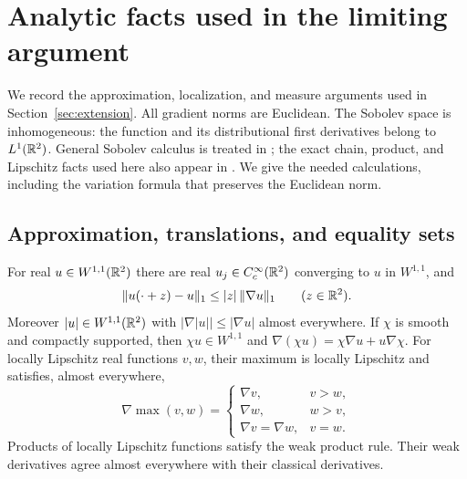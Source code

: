 \section{Analytic facts used in the limiting argument}
\label{app:analytic-tools}

We record the approximation, localization, and measure arguments
used in Section~\ref{sec:extension}. All gradient norms are
Euclidean. The Sobolev space is inhomogeneous: the function and
its distributional first derivatives belong to $L^1(\mathbb R^2)$.
General Sobolev calculus is treated in \cite{EvansGariepy2015};
the exact chain, product, and Lipschitz facts used here also appear
in \cite[Chapter~3, Propositions~3.21--3.22 and
Theorems~3.38--3.39]{Hunter2014}. We give the needed calculations,
including the variation formula that preserves the Euclidean norm.

\subsection{Approximation, translations, and equality sets}

\begin{lemma}\label{lem:appendix-sobolev-calculus}
For real $u\in W^{1,1}(\mathbb R^2)$ there are real
$u_j\in C_c^\infty(\mathbb R^2)$ converging to $u$ in $W^{1,1}$, and
\begin{equation}\label{eq:appendix-translation}
 \|u(\cdot+z)-u\|_1\le |z|\,\|\nabla u\|_1
 \qquad(z\in\mathbb R^2).
\end{equation}
Moreover $|u|\in W^{1,1}(\mathbb R^2)$ with
$|\nabla|u||\le|\nabla u|$ almost everywhere. If $\chi$ is
smooth and compactly supported, then $\chi u\in W^{1,1}$ and
$\nabla(\chi u)=\chi\nabla u+u\nabla\chi$.
For locally Lipschitz real functions $v,w$, their maximum is
locally Lipschitz and satisfies, almost everywhere,
\begin{equation}\label{eq:appendix-maximum}
 \nabla\max(v,w)=
 \begin{cases}
  \nabla v,&v>w,\\
  \nabla w,&w>v,\\
  \nabla v=\nabla w,&v=w.
 \end{cases}
\end{equation}
Products of locally Lipschitz functions satisfy the weak product
rule. Their weak derivatives agree almost everywhere with their
classical derivatives.
\end{lemma}

